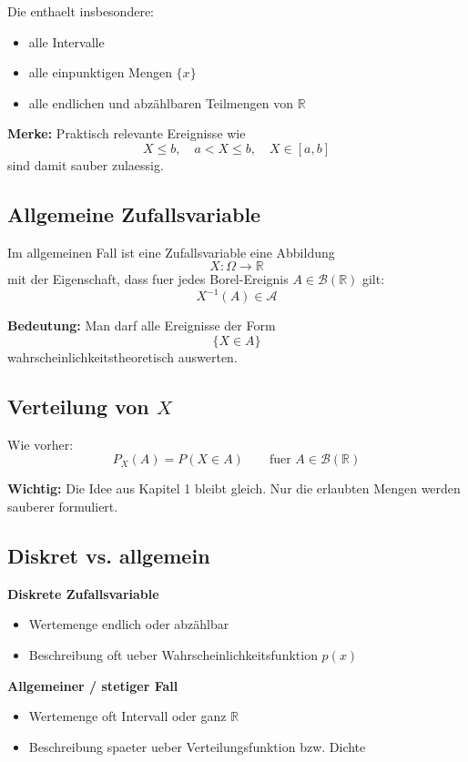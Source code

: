 \documentclass[a4paper,11pt]{article}
\begin{document}
Die enthaelt insbesondere:
\begin{itemize}
  \item alle Intervalle
  \item alle einpunktigen Mengen $\{x\}$
  \item alle endlichen und abz\"ahlbaren Teilmengen von $\mathbb R$
\end{itemize}

\textbf{Merke:}
Praktisch relevante Ereignisse wie
\[
X\le b,\quad a<X\le b,\quad X\in [a,b]
\]
sind damit sauber zulaessig.

\subsection{Allgemeine Zufallsvariable}
Im allgemeinen Fall ist eine Zufallsvariable eine Abbildung
\[
X:\Omega\to \mathbb R
\]
mit der Eigenschaft, dass fuer jedes Borel-Ereignis $A \in \mathcal B(\mathbb R)$ gilt:
\[
X^{-1}(A)\in \mathcal A
\]

\textbf{Bedeutung:}
Man darf alle Ereignisse der Form
\[
\{X\in A\}
\]
wahrscheinlichkeitstheoretisch auswerten.

\subsection{Verteilung von $X$}
Wie vorher:
\[
P_X(A)=P(X\in A)
\qquad \text{fuer } A\in \mathcal B(\mathbb R)
\]

\textbf{Wichtig:}
Die Idee aus Kapitel 1 bleibt gleich. Nur die erlaubten Mengen werden sauberer formuliert.

\subsection{Diskret vs. allgemein}
\textbf{Diskrete Zufallsvariable}
\begin{itemize}
  \item Wertemenge endlich oder abz\"ahlbar
  \item Beschreibung oft ueber Wahrscheinlichkeitsfunktion $p(x)$
\end{itemize}

\textbf{Allgemeiner / stetiger Fall}
\begin{itemize}
  \item Wertemenge oft Intervall oder ganz $\mathbb R$
  \item Beschreibung spaeter ueber Verteilungsfunktion bzw. Dichte
\end{itemize}
\end{document}
